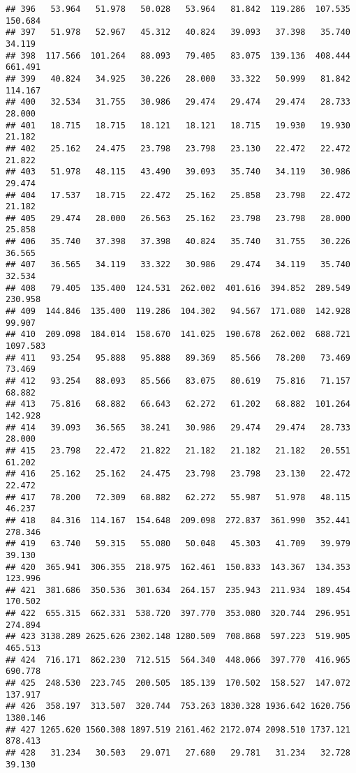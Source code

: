 \documentclass[
]{article}
\begin{document}
\begin{verbatim}
## 396   53.964   51.978   50.028   53.964   81.842  119.286  107.535  150.684
## 397   51.978   52.967   45.312   40.824   39.093   37.398   35.740   34.119
## 398  117.566  101.264   88.093   79.405   83.075  139.136  408.444  661.491
## 399   40.824   34.925   30.226   28.000   33.322   50.999   81.842  114.167
## 400   32.534   31.755   30.986   29.474   29.474   29.474   28.733   28.000
## 401   18.715   18.715   18.121   18.121   18.715   19.930   19.930   21.182
## 402   25.162   24.475   23.798   23.798   23.130   22.472   22.472   21.822
## 403   51.978   48.115   43.490   39.093   35.740   34.119   30.986   29.474
## 404   17.537   18.715   22.472   25.162   25.858   23.798   22.472   21.182
## 405   29.474   28.000   26.563   25.162   23.798   23.798   28.000   25.858
## 406   35.740   37.398   37.398   40.824   35.740   31.755   30.226   36.565
## 407   36.565   34.119   33.322   30.986   29.474   34.119   35.740   32.534
## 408   79.405  135.400  124.531  262.002  401.616  394.852  289.549  230.958
## 409  144.846  135.400  119.286  104.302   94.567  171.080  142.928   99.907
## 410  209.098  184.014  158.670  141.025  190.678  262.002  688.721 1097.583
## 411   93.254   95.888   95.888   89.369   85.566   78.200   73.469   73.469
## 412   93.254   88.093   85.566   83.075   80.619   75.816   71.157   68.882
## 413   75.816   68.882   66.643   62.272   61.202   68.882  101.264  142.928
## 414   39.093   36.565   38.241   30.986   29.474   29.474   28.733   28.000
## 415   23.798   22.472   21.822   21.182   21.182   21.182   20.551   61.202
## 416   25.162   25.162   24.475   23.798   23.798   23.130   22.472   22.472
## 417   78.200   72.309   68.882   62.272   55.987   51.978   48.115   46.237
## 418   84.316  114.167  154.648  209.098  272.837  361.990  352.441  278.346
## 419   63.740   59.315   55.080   50.048   45.303   41.709   39.979   39.130
## 420  365.941  306.355  218.975  162.461  150.833  143.367  134.353  123.996
## 421  381.686  350.536  301.634  264.157  235.943  211.934  189.454  170.502
## 422  655.315  662.331  538.720  397.770  353.080  320.744  296.951  274.894
## 423 3138.289 2625.626 2302.148 1280.509  708.868  597.223  519.905  465.513
## 424  716.171  862.230  712.515  564.340  448.066  397.770  416.965  690.778
## 425  248.530  223.745  200.505  185.139  170.502  158.527  147.072  137.917
## 426  358.197  313.507  320.744  753.263 1830.328 1936.642 1620.756 1380.146
## 427 1265.620 1560.308 1897.519 2161.462 2172.074 2098.510 1737.121  878.413
## 428   31.234   30.503   29.071   27.680   29.781   31.234   32.728   39.130

\end{verbatim}
\end{document}
